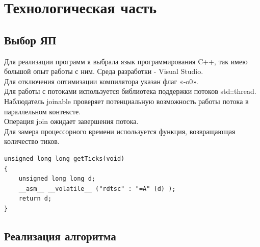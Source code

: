 \documentclass[12pt]{report}
\begin{document}
\chapter{Технологическая часть}
\section{Выбор ЯП}
Для реализации программ я выбрала язык программирования C++, так имею большой опыт работы с ним. Среда разработки - Visual Studio. \\

Для отключения оптимизации компилятора указан флаг «-o0».\\
Для работы с потоками используется библиотека поддержки потоков std::thread. \\
Наблюдатель joinable  проверяет потенциальную возможность работы потока в параллельном контексте.\\
Операция join ожидает завершения потока. \\

Для замера процессорного времени используется функция, возвращающая количество тиков.\\

\begin{lstlisting}[label=some-code,caption=Функция получения тиков]
unsigned long long getTicks(void)
{
    unsigned long long d;
    __asm__ __volatile__ ("rdtsc" : "=A" (d) );
    return d;
}

\end{lstlisting}

\section{Реализация алгоритма}
\end{document}
